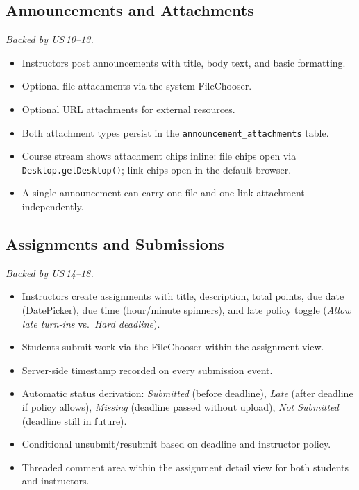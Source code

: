 \documentclass[12pt, a4paper]{article}
\begin{document}
{\subsection{Announcements and Attachments}
\textit{Backed by US\,10--13.}
\begin{itemize}
  \item Instructors post announcements with title, body text, and basic formatting.
  \item Optional file attachments via the system FileChooser.
  \item Optional URL attachments for external resources.
  \item Both attachment types persist in the \texttt{announcement\_attachments} table.
  \item Course stream shows attachment chips inline: file chips open via
        \texttt{Desktop.getDesktop()}; link chips open in the default browser.
  \item A single announcement can carry one file and one link attachment independently.
\end{itemize}

\subsection{Assignments and Submissions}
\textit{Backed by US\,14--18.}
\begin{itemize}
  \item Instructors create assignments with title, description, total points,
        due date (DatePicker), due time (hour/minute spinners), and late
        policy toggle (\emph{Allow late turn-ins} vs.\ \emph{Hard deadline}).
  \item Students submit work via the FileChooser within the assignment view.
  \item Server-side timestamp recorded on every submission event.
  \item Automatic status derivation: \emph{Submitted} (before deadline),
        \emph{Late} (after deadline if policy allows), \emph{Missing}
        (deadline passed without upload), \emph{Not Submitted} (deadline
        still in future).
  \item Conditional unsubmit/resubmit based on deadline and instructor policy.
  \item Threaded comment area within the assignment detail view for both students and instructors.
\end{itemize}

}
\end{document}
